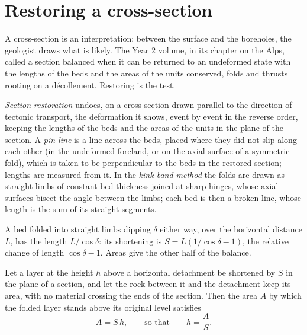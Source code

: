 \section{Restoring a cross-section}\label{sec:b3:structural-analysis:restoration}

A cross-section is an interpretation: between the surface and the boreholes,
the geologist draws what is likely. The Year 2 volume, in its chapter on the
Alps, called a section balanced when it can be returned to an undeformed state
with the lengths of the beds and the areas of the units conserved, folds and
thrusts rooting on a décollement. Restoring is the test.

\begin{definition}\label{def:b3:structural-analysis:restoration}
\emph{Section restoration} undoes, on a
cross-section drawn parallel to the direction of tectonic transport, the
deformation it shows, event by event in the reverse order, keeping the
lengths of the beds and the areas of the units in the plane of the section.
A \emph{pin line} is a line across the beds, placed where they
did not slip along each other (in the undeformed foreland, or on the axial
surface of a symmetric fold), which is taken to be perpendicular to the beds
in the restored section; lengths are measured from it. In the
\emph{kink-band method} the folds are drawn as straight
limbs of constant bed thickness joined at sharp hinges, whose axial surfaces
bisect the angle between the limbs; each bed is then a broken line, whose
length is the sum of its straight segments.
\end{definition}

A bed folded into straight limbs dipping $\delta$ either way, over the
horizontal distance $L$, has the length $L/\cos\delta$: its shortening is
$S = L(1/\cos\delta - 1)$, the relative change of length $\cos\delta - 1$.
Areas give the other half of the balance.

\begin{proposition}\label{prop:b3:structural-analysis:detachment}
Let a layer at the height $h$ above a horizontal detachment be shortened by $S$
in the plane of a section, and let the rock between it and the detachment
keep its area, with no material crossing the ends of the section. Then the
area $A$ by which the folded layer stands above its original level satisfies
\[
  A = S\,h , \qquad\text{so that}\qquad h = \frac AS .
\]
\end{proposition}

